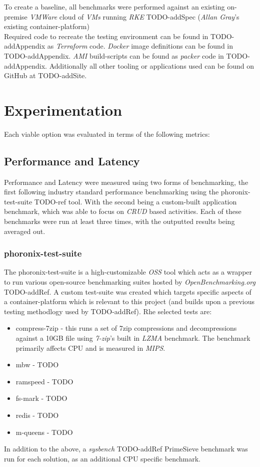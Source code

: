 To create a baseline, all benchmarks were performed against an existing on-premise \emph{VMWare} cloud of \emph{VMs} running \emph{RKE} TODO-addSpec (\emph{Allan Gray}'s existing container-platform) \\

\noindent Required code to recreate the testing environment can be found in TODO-addAppendix as \emph{Terraform} code.
\emph{Docker} image definitions can be found in TODO-addAppendix.
\emph{AMI} build-scripts can be found as \emph{packer} code in TODO-addAppendix.
Additionally all other tooling or applications used can be found on GitHub at TODO-addSite.

\chapter{Experimentation}
Each viable option was evaluated in terms of the following metrics:
\section{Performance and Latency}
Performance and Latency were measured using two forms of benchmarking, the first following industry standard performance benchmarking using the phoronix-test-suite TODO-ref tool.
With the second being a custom-built application benchmark, which was able to focus on \emph{CRUD} based activities.
Each of these benchmarks were run at least three times, with the outputted results being averaged out.

\subsection{phoronix-test-suite}
The phoronix-test-suite is a high-customizable \emph{OSS} tool which acts as a wrapper to run various open-source benchmarking suites hosted by \emph{OpenBenchmarking.org} TODO-addRef.
A custom test-suite was created which targets specific aspects of a container-platform which is relevant to this project (and builds upon a previous testing methodlogy used by TODO-addRef).
Rhe selected tests are:
\begin{itemize}
  \item compress-7zip - this runs a set of 7zip compressions and decompressions against a 10GB file using \emph{7-zip}'s built in \emph{LZMA} benchmark.
        The benchmark primarily affects CPU and is measured in \emph{MIPS}.
  \item mbw - TODO
  \item ramspeed - TODO
  \item fs-mark - TODO
  \item redis - TODO
  \item m-queens - TODO
\end{itemize}
In addition to the above, a \emph{sysbench} TODO-addRef PrimeSieve benchmark was run for each solution, as an additional CPU specific benchmark.


